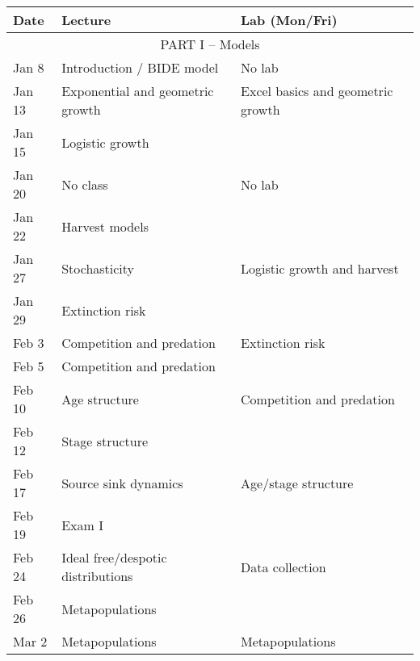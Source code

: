 \documentclass[12pt]{article}
\begin{document}
\begin{center}
\begin{tabular}[c]{lll}
\hline \hline
{\bf Date} & {\bf Lecture}                      & {\bf Lab (Mon/Fri)}               \\
\hline
           \multicolumn{3}{c}{PART I -- Models}                                     \\
\hline
Jan 8      & Introduction / BIDE model          & No lab                            \\
\hline
Jan 13     & Exponential and geometric growth   & Excel basics and geometric growth \\
Jan 15     & Logistic growth                    &                                   \\
\hline
Jan 20     & No class                           & No lab
        \\
Jan 22     & Harvest models                     &                                   \\
\hline
Jan 27     & Stochasticity                      & Logistic growth and harvest       \\
Jan 29     & Extinction risk                    &                                   \\
\hline
Feb 3      & Competition and predation          & Extinction risk                   \\
Feb 5      & Competition and predation          &                                   \\
\hline
Feb 10     & Age structure                      & Competition and predation         \\
Feb 12     & Stage structure                    &                                   \\
\hline
Feb 17     & Source sink dynamics               & Age/stage structure               \\
Feb 19     & Exam I                             &                                   \\
\hline
Feb 24     & Ideal free/despotic distributions  & Data collection                   \\
Feb 26     & Metapopulations                    &                                   \\
\hline
Mar 2      & Metapopulations                    & Metapopulations                   \\

\end{tabular}
\end{center}
\end{document}
